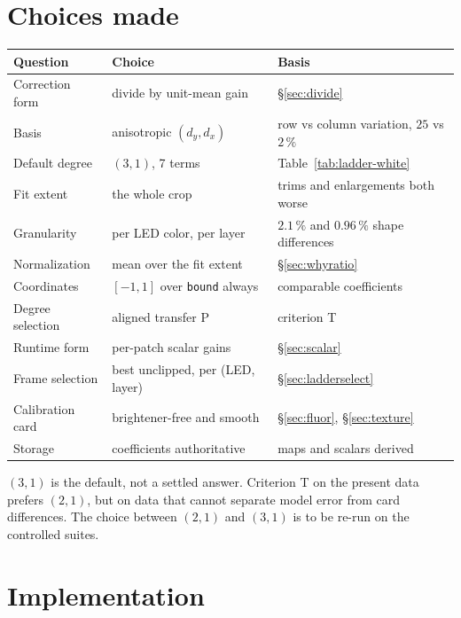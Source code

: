 \documentclass[11pt, a4paper]{article}
\newcommand{\code}[1]{\texttt{#1}}
\newcommand{\pct}{\,\%}
\begin{document}
\section{Choices made}
\label{sec:choices}

\begin{center}
\small
\begin{tabular}{lll}
\toprule
Question & Choice & Basis \\
\midrule
Correction form   & divide by unit-mean gain & \S\ref{sec:divide} \\
Basis             & anisotropic $(d_y,d_x)$  & row vs column variation, $25$ vs $2\pct$ \\
Default degree    & $(3,1)$, 7 terms         & Table~\ref{tab:ladder-white} \\
Fit extent        & the whole crop           & trims and enlargements both worse \\
Granularity       & per LED color, per layer & $2.1\pct$ and $0.96\pct$ shape differences \\
Normalization     & mean over the fit extent & \S\ref{sec:whyratio} \\
Coordinates       & $[-1,1]$ over \code{bound} always & comparable coefficients \\
Degree selection  & aligned transfer P       & criterion T \\
Runtime form      & per-patch scalar gains   & \S\ref{sec:scalar} \\
Frame selection   & best unclipped, per (LED, layer) & \S\ref{sec:ladderselect} \\
Calibration card  & brightener-free and smooth & \S\ref{sec:fluor}, \S\ref{sec:texture} \\
Storage           & coefficients authoritative & maps and scalars derived \\
\bottomrule
\end{tabular}
\end{center}

$(3,1)$ is the default, not a settled answer.
Criterion T on the present data prefers $(2,1)$,
but on data that cannot separate model error from card differences.
The choice between $(2,1)$ and $(3,1)$
is to be re-run on the controlled suites.

\section{Implementation}
\label{sec:implementation}
\end{document}
